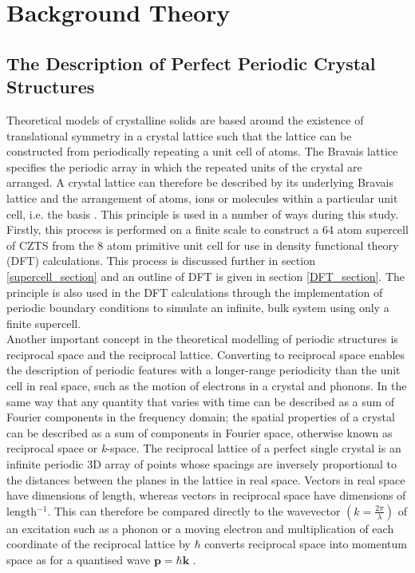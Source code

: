 
\chapter{Background Theory}

\label{ch:background}

\section{The Description of Perfect Periodic Crystal Structures}
Theoretical models of crystalline solids are based around the existence of translational symmetry in a crystal lattice such that the lattice can be constructed from periodically repeating a unit cell of atoms. The Bravais lattice specifies the periodic array in which the repeated units of the crystal are arranged. A crystal lattice can therefore be described by its underlying Bravais lattice and the arrangement of atoms, ions or molecules within a particular unit cell, i.e. the basis \cite{AshcroftMermin2}. This principle is used in a number of ways during this study. Firstly, this process is performed on a finite scale to construct a 64 atom supercell of CZTS from the 8 atom primitive unit cell for use in density functional theory (DFT) calculations. This process is discussed further in section \ref{supercell_section} and an outline of DFT is given in section \ref{DFT_section}. The principle is also used in the DFT calculations through the implementation of periodic boundary conditions to simulate an infinite, bulk system using only a finite supercell.\\
 
Another important concept in the theoretical modelling of periodic structures is reciprocal space and the reciprocal lattice. 
Converting to reciprocal space enables the description of periodic features with a longer-range periodicity than the unit cell in real space, such as the motion of electrons in a crystal and phonons.
In the same way that any quantity that varies with time can be described as a sum of Fourier components in the frequency domain; the spatial properties of a crystal can be described as a sum of components in Fourier space, otherwise known as reciprocal space or \textit{k}-space. The reciprocal lattice of a perfect single crystal is an infinite periodic 3D array of points whose spacings are inversely proportional to the distances between the planes in the lattice in real space. Vectors in real space have dimensions of length, whereas vectors in reciprocal space have dimensions of length$^{-1}$. This can therefore be compared directly to the wavevector $ \left(k  = \frac{2\pi}{\lambda} \right)$ of an excitation such as a phonon or a moving electron and multiplication of each coordinate of the reciprocal lattice by $\hbar$ converts reciprocal space into momentum space as for a quantised wave $\mathbf{p} = \hbar \mathbf{k}$ \cite{Blakemore1}. \\ 

